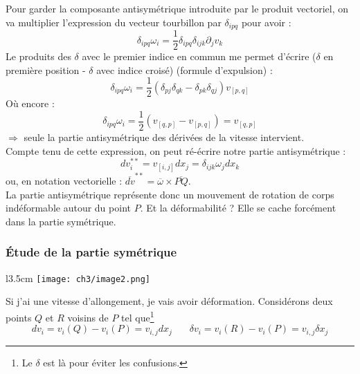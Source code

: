 Pour garder la composante antisymétrique introduite par le produit vectoriel, on va
multiplier l'expression du vecteur tourbillon par $\delta_{ipq}$ pour avoir :
\begin{equation}
	\delta_{ipq}\omega_i = \frac{1}{2}\delta_{ipq}\delta_{ijk}\partial_jv_k
\end{equation}
Le produits des $\delta$ avec le premier indice en commun me permet d'écrire ($\delta$
en première position - $\delta$ avec indice croisé) (formule d'expulsion) :
\begin{equation}
	\delta_{ipq}\omega_i = \frac{1}{2}(\delta_{pj}\delta_{qk} - \delta_{pk}\delta_{qj})
	v_{[p,q]}
\end{equation}
Où encore : 
\begin{equation}
	\delta_{ipq}\omega_i = \frac{1}{2}(v_{[q,p]}-v_{[p,q]}) = v_{[q,p]}
\end{equation}
$\Rightarrow$ seule la partie antisymétrique des dérivées de la vitesse intervient.\\
         
Compte tenu de cette expression, on peut ré-écrire notre partie antisymétrique :
\begin{equation}
	dv_i^{**} = v_{[i,j]}dx_j = \delta_{ijk}\omega_jdx_k
\end{equation}
ou, en notation vectorielle : $\overline{dv}^{**} = \overline{\omega}\times
\overline{PQ}$.\\
La partie antisymétrique représente donc un mouvement de rotation de corps indéformable
autour du point $P$. Et la déformabilité ? Elle se cache forcément dans la partie
symétrique.
         
         
         
         
         
\subsubsection{Étude de la partie symétrique}
\begin{wrapfigure}[7]{l}{3.5cm}
	\texttt{[image: ch3/image2.png]}
\end{wrapfigure}
Si j'ai une vitesse d'allongement, je vais avoir déformation.  Considérons deux points
$Q$ et $R$ voisins de $P$ tel que\footnote{Le $\delta$ est là pour éviter les confusions.}
\begin{equation}
	dv_i = v_i(Q) - v_i(P) = v_{i,j} dx_j\ \ \ \ \ \ \ \ \delta v_i = v_i(R) - v_i(P) =
	v_{i,j}\delta x_j
\end{equation}
         
